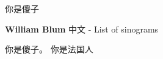 \documentclass{article}
\begin{document}
\selectfont
你是傻子

\begin{center}
\textbf{William Blum}
中文 - List of sinograms
\end{center}


\selectfont
你是傻子。 你是法国人
\end{document}
